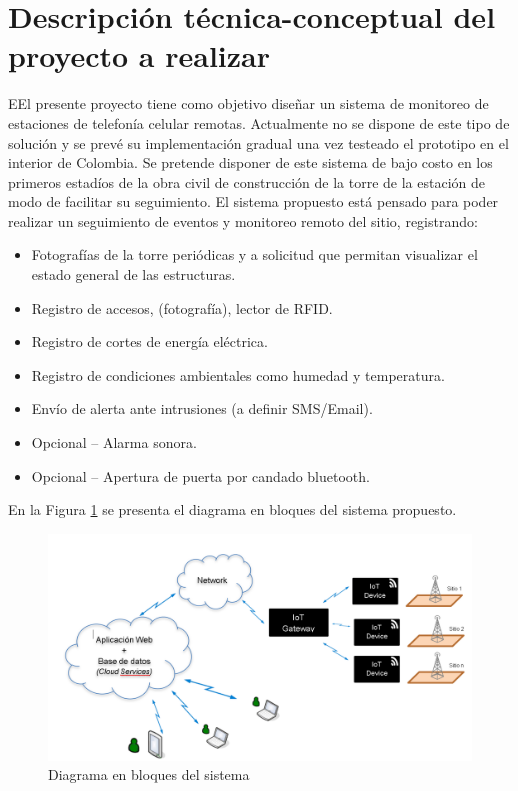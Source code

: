 \documentclass[11pt]{charter}
\begin{document}
\section{Descripción técnica-conceptual del proyecto a realizar}
\label{sec:descripcion}

\begin{consigna}
EEl presente proyecto tiene como objetivo diseñar un sistema de monitoreo de estaciones de telefonía celular remotas. Actualmente no se dispone de este tipo de solución y se prevé su implementación gradual una vez testeado el prototipo en el interior de Colombia.
Se pretende disponer de este sistema de bajo costo en los primeros estadíos de la obra civil de construcción de la torre de la estación de modo de facilitar su seguimiento.
El sistema propuesto está pensado para poder realizar un seguimiento de eventos y monitoreo remoto del sitio, registrando:
\begin{itemize}
\item Fotografías de la torre periódicas y a solicitud que permitan visualizar el estado general
de las estructuras.
\item Registro de accesos, (fotografía), lector de RFID.
\item Registro de cortes de energía eléctrica.
\item Registro de condiciones ambientales como humedad y temperatura.
\item Envío de alerta ante intrusiones (a definir SMS/Email).
\item Opcional – Alarma sonora.
\item Opcional – Apertura de puerta por candado bluetooth.
\end{itemize}

En la Figura \ref{fig:diagBloques} se presenta el diagrama en bloques del sistema propuesto. 

\vspace{25px}

\begin{figure}[htpb]
\centering 
\includegraphics[width=\textwidth]{./Figuras/diagBloques.png}
\caption{Diagrama en bloques del sistema}
\label{fig:diagBloques}
\end{figure}

\vspace{25px}

\end{consigna}
\end{document}
